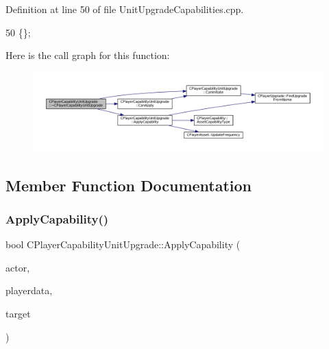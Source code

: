 Definition at line 50 of file Unit\+Upgrade\+Capabilities.\+cpp.


\begin{DoxyCode}
50 \{\};
\end{DoxyCode}
Here is the call graph for this function\+:
\nopagebreak
\begin{figure}[H]
\begin{center}
\leavevmode
\includegraphics[width=350pt]{classCPlayerCapabilityUnitUpgrade_a7784e1fb92a26acb700c06ab38d2733b_cgraph}
\end{center}
\end{figure}


\subsection{Member Function Documentation}
\hypertarget{classCPlayerCapabilityUnitUpgrade_a8cc6fee17dd178fd798e36c3d5301e9d}{}\label{classCPlayerCapabilityUnitUpgrade_a8cc6fee17dd178fd798e36c3d5301e9d} 
\subsubsection{\texorpdfstring{Apply\+Capability()}{ApplyCapability()}}
{\footnotesize\ttfamily bool C\+Player\+Capability\+Unit\+Upgrade\+::\+Apply\+Capability (\begin{DoxyParamCaption}\item[{std\+::shared\+\_\+ptr$<$ \hyperlink{classCPlayerAsset}{C\+Player\+Asset} $>$}]{actor,  }\item[{std\+::shared\+\_\+ptr$<$ \hyperlink{classCPlayerData}{C\+Player\+Data} $>$}]{playerdata,  }\item[{std\+::shared\+\_\+ptr$<$ \hyperlink{classCPlayerAsset}{C\+Player\+Asset} $>$}]{target }\end{DoxyParamCaption})\hspace{0.3cm}{\ttfamily [virtual]}}



